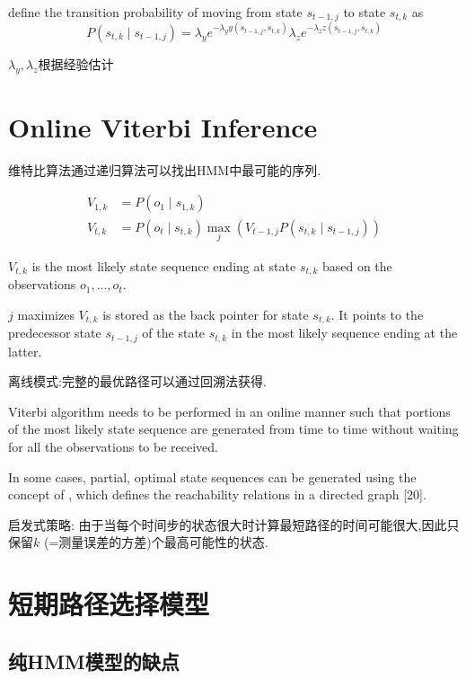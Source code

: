 define the transition probability of moving from state $ s_{t-1, j} $ to state $ s_{t, k} $ as
$$
P\left(s_{t, k} \mid s_{t-1, j}\right)=\lambda_{y} e^{-\lambda_{y} y\left(s_{t-1, j}, s_{t, k}\right)} \lambda_{z} e^{-\lambda_{z} z\left(s_{t-1, j}, s_{t, k}\right)}
$$

$\lambda_{y}, \lambda_{z}$根据经验估计

\section{Online Viterbi Inference}

维特比算法通过递归算法可以找出HMM中最可能的序列. 

$$ \begin{aligned} V_{1, k} &=P\left(o_{1} \mid s_{1, k}\right) \\ V_{t, k} &=P\left(o_{t} \mid s_{t, k}\right) \max _{j}\left(V_{t-1, j} P\left(s_{t, k} \mid s_{t-1, j}\right)\right) \end{aligned} $$

$ V_{t, k} $ is the most likely state sequence ending at state $ s_{t, k} $ based on the observations $ o_{1}, \ldots, o_{t} . $

$j$ maximizes
$V_{t, k}$ is stored as the back pointer for state $s_{t, k}$. It points to the predecessor state $s_{t-1, j}$ of the state $s_{t, k}$ in the most likely sequence ending at the latter.

离线模式:完整的最优路径可以通过回溯法获得.

Viterbi algorithm needs to be performed in
an online manner such that portions of the most likely state
sequence are generated from time to time without waiting for
all the observations to be received.

In some cases, partial,
optimal state sequences can be generated using the concept
of , which defines the reachability relations
in a directed graph [20].

启发式策略: 由于当每个时间步的状态很大时计算最短路径的时间可能很大,因此只保留$k$ (=测量误差的方差)个最高可能性的状态.

\section{短期路径选择模型}

\subsection{纯HMM模型的缺点}

